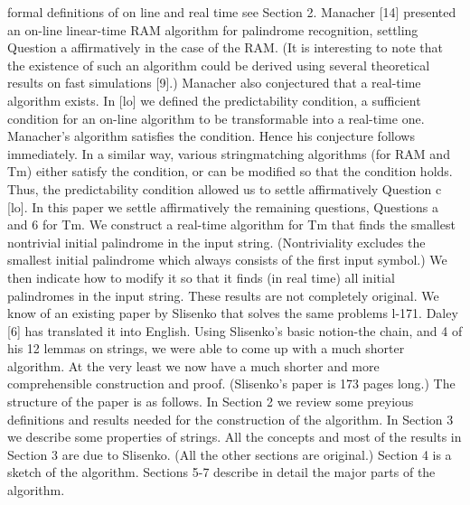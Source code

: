 \documentclass[11pt,a4paper]{report}
\begin{document}
formal definitions of on line and real time see Section 2.
Manacher [14] presented an on-line linear-time RAM algorithm for palindrome
recognition, settling Question a affirmatively in the case of the RAM. (It is interesting
to note that the existence of such an algorithm could be derived using several theoretical
results on fast simulations [9].) Manacher also conjectured that a real-time algorithm
exists. In [lo] we defined the predictability condition, a sufficient condition for an on-line
algorithm to be transformable into a real-time one. Manacher’s algorithm satisfies the
condition. Hence his conjecture follows immediately. In a similar way, various stringmatching algorithms (for RAM and Tm) either satisfy the condition, or can be modified
so that the condition holds. Thus, the predictability condition allowed us to settle
affirmatively Question c [lo].
In this paper we settle affirmatively the remaining questions, Questions a and 6 for Tm.
We construct a real-time algorithm for Tm that finds the smallest nontrivial initial
palindrome in the input string. (Nontriviality excludes the smallest initial palindrome
which always consists of the first input symbol.) We then indicate how to modify it so
that it finds (in real time) all initial palindromes in the input string.
These results are not completely original. We know of an existing paper by Slisenko
that solves the same problems l-171. Daley [6] has translated it into English. Using
Slisenko’s basic notion-the chain, and 4 of his 12 lemmas on strings, we were able to
come up with a much shorter algorithm. At the very least we now have a much shorter
and more comprehensible construction and proof. (Slisenko’s paper is 173 pages long.)
The structure of the paper is as follows. In Section 2 we review some preyious definitions
and results needed for the construction of the algorithm. In Section 3 we describe some
properties of strings. All the concepts and most of the results in Section 3 are due to
Slisenko. (All the other sections are original.) Section 4 is a sketch of the algorithm.
Sections 5-7 describe in detail the major parts of the algorithm. 
\end{document}
